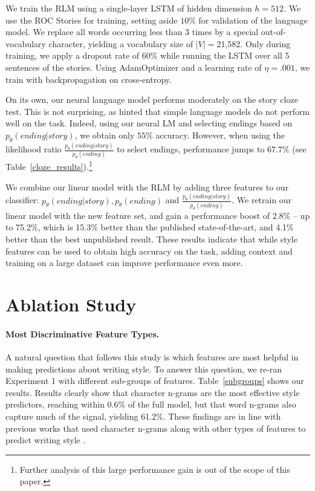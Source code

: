 \documentclass[11pt,a4paper]{article}
\newcommand{\tabref}[1]{Table~\ref{#1}}
\newcommand{\isection}[2]{\section{#1}\label{ssec:#2}}
\begin{document}
We train the RLM using a single-layer LSTM \cite{hochreiter1997long} of hidden dimension $h=512$.
We use the ROC Stories for training, setting aside $10\%$ for validation of the language model. 
We replace all words occurring less than 3 times by a special out-of-vocabulary character, yielding a vocabulary size of $|V|=$21,582.
Only during training, we apply a dropout rate of 60\% while running the LSTM over all 5 sentences of the stories. 
Using AdamOptimizer \cite{kingma2014adam} and a learning rate of $\eta=.001$, we train with backpropagation on cross-entropy. %


On its own, our neural language model performs moderately on the story cloze test. 
This is not surprising, as \citet{Mostafazadeh:2016} hinted  that simple language models do not perform well on the task. 
Indeed, using our neural LM and selecting endings based on $p_\theta(ending|story)$, we obtain only $55\%$ accuracy. 
However, when using the likelihood ratio $\frac{p_\theta(ending|story)}{p_\theta(ending)}$ to select endings, performance jumps to $67.7\%$ (see \tabref{cloze_results}).\footnote{Further analysis of this large performance gain is out of the scope of this paper.}

We combine our linear model with the RLM by adding three features to our classifier: $p_\theta(ending|story),p_\theta(ending)$ and $\frac{p_\theta(ending|story)}{p_\theta(ending)}$. 
We retrain our linear  model with the new feature set, and gain a performance   boost  of $2.8\%$ -- up to 75.2\%, which is 15.3\% better than the published state-of-the-art, and 4.1\% better than the best unpublished result.
These results indicate that while style features can be used to obtain high accuracy on the task, adding context and training on a large dataset can improve performance even more.




\isection{Ablation Study}{Ablation}



\paragraph{Most Discriminative Feature Types.}
A natural question that follows this study is which features are most helpful in making predictions about writing style. 
To answer this question, we re-ran Experiment 1 with different sub-groups of features. 
\tabref{subgroups} shows our results. Results clearly show that  character n-grams are the most effective style predictors, reaching within  0.6\% of the full model, but that word n-grams also capture much of the signal, yielding 61.2\%. 
These findings are in line with previous works that used character n-grams along with other types of features to predict writing  style \cite{Schwartz:2013}.
\end{document}
